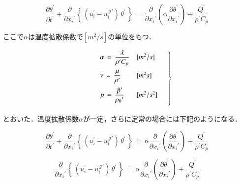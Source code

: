 \begin{equation}
\frac{\partial \theta^{\prime}}{\partial{t}^{\prime}} + \frac{\partial}{\partial{{x}_{i}}^{\prime}} \left\{ \, \left( u_i^\prime - u_i^{\,g\,\prime} \right) \, \theta^\prime \, \right \}
\,{=}\, 
\frac{\partial}{\partial{{x}_{i}}^{\prime}} \left({ \mathrm{\alpha} \frac{\partial \theta^{\prime}}{\partial{{x}_{i}}^{\prime}} }\right) + \frac{Q^{\prime}}{\rho^{\prime}{C}_{p}}
\label{eq:thermal transport eq}
\end{equation}

\noindent ここで$\alpha$は温度拡散係数で$[m^2/s]$の単位をもつ．

\begin{equation}
\qquad \left.
\begin{array}{ll}
\vspace{2mm}
\alpha\,=\, \displaystyle{ \frac{\lambda}{\rho^{\prime} C_{p}} } & [m^2/s]\\
\vspace{2mm}
\nu\,=\, \displaystyle{ \frac{\mu}{\rho^{\prime}} } & [m^2s]\\
\vspace{2mm}
p\,=\, \displaystyle{ \frac{{\tilde{p}}^{\prime}}{{\rho_{0}}^{\prime}} } & [m^2/s^2]
\end{array} \quad \right\}
\label{eq:thermal transport eq2}
\end{equation}

\noindent とおいた．温度拡散係数$\alpha$が一定，さらに定常の場合には下記のようになる．

\begin{equation}
\frac{\partial \theta^{\prime}}{\partial{t}^{\prime}} + \frac{\partial}{\partial{{x}_{i}}^{\prime}} \left\{ \, \left( u_i^\prime - u_i^{\,g\,\prime} \right) \, \theta^\prime \, \right \} 
\,{=}\,
\mathrm{\alpha} \frac{\partial}{\partial{{x}_{i}}^{\prime}} \left({ \frac{\partial \theta^{\prime}}{\partial{{x}_{i}}^{\prime}} }\right) + \frac{Q^{\prime}} {\rho^{\prime} {C}_{p}}
\label{thermal transport eq:const alpha}
\end{equation}

\begin{equation}
\frac{\partial}{\partial{{x}_{i}}^{\prime}} \left\{ \, \left( u_i^\prime - u_i^{\,g\,\prime} \right) \, \theta^\prime \, \right \}  
\,{=}\,
\mathrm{\alpha} \frac{\partial}{\partial{{x}_{i}}^{\prime}} \left({ \frac{\partial \theta^{\prime}}{\partial{{x}_{i}}^{\prime}} }\right) + \frac{Q^{\prime}}{\rho^{\prime} {C}_{p}}
\label{eq:steady thermal transport eq:const alpha}
\end{equation}

